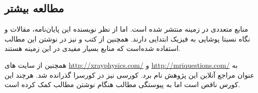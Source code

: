\begin{figure}
	\centering
	\caption{}
	\label{fig:slice-selection-process}
\end{figure}

\begin{figure}
	\centering
	\caption{}
	\label{fig:concept-of-phase-encoding}
\end{figure}








\FloatBarrier
\subsection{مطالعه بیشتر}
منابع متعددی در زمینه \mri منتشر شده است. اما از نظر نویسنده این پایان‌نامه، مقالات \cite{McRobbie} و \cite{SpinEchoMagnetic2013} نگاه نسبتا پوشایی به فیزیک ابتدایی \mri دارند. همچنین از کتب \cite{book:basic-principles-and-applications} و \cite{book:MRIfromPictureToProton} نیز در نوشتن این مطالب استفاده شده‌است که منابع بسیار مفیدی در این زمینه هستند.

 همچنین از سایت های
 \url{http://xrayphysics.com/} و
 \url{http://mriquestions.com/}
 به عنوان مراجع آنلاین این پژوهش نام برد. کورسی نیز در کورسرا
گذرانده شد. هرچند این کورس ناقص است اما به پیوستگی مطالب هنگام نوشتن مطالب کمک کرده است.
